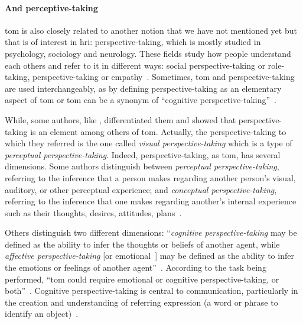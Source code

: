 \documentclass[a4paper,11pt,twoside]{StyleThese}
\begin{document}
\paragraph{And perceptive-taking} \acrshort{tom} is also closely related to another notion that we have not mentioned yet but that is of interest in \acrshort{hri}: perspective-taking, which is mostly studied in psychology, sociology and neurology. These fields study how people understand each others and refer to it in different ways: social perspective-taking or role-taking, perspective-taking or empathy~\citep{davis_2017_self,quesque_2020_theory}. Sometimes, \acrshort{tom} and perspective-taking are used interchangeably, as by \cite{charlop_2003_using} defining perspective-taking as an elementary aspect of \acrshort{tom} or \acrshort{tom} can be a synonym of ``cognitive perspective-taking''~\citep{barnes_2004_perspective}. 

While, some authors, like \cite{westby_2014_developmental}, differentiated them and showed that perspective-taking is an element among others of \acrshort{tom}. Actually, the perspective-taking to which they referred is the one called \emph{visual perspective-taking} which is a type of \emph{perceptual perspective-taking}. Indeed, perspective-taking, as \acrshort{tom}, has several dimensions. Some authors distinguish between \emph{perceptual perspective-taking}, referring to the inference that a person makes regarding another person's visual, auditory, or other perceptual experience; and \emph{conceptual perspective-taking}, referring to the inference that one makes regarding another's internal experience such as their thoughts, desires, attitudes, plans~\citep{marvin_1976_early}. 

Others distinguish two different dimensions: ``\emph{cognitive perspective-taking} may be defined as the ability to infer the thoughts or beliefs of another agent, while \emph{affective perspective-taking} [or emotional~\citep{hynes_2006_differential}] may be defined as the ability to infer the emotions or feelings of another agent''~\citep[p.~2]{healey_2018_cognitive}. According to the task being performed, ``\acrlong{tom} could require emotional or cognitive perspective-taking, or both''~\citep[p.~375]{hynes_2006_differential}. Cognitive perspective-taking is central to communication, particularly in the creation and understanding of referring expression (\ie a word or phrase to identify an object)~\citep{krauss_1991_perspective}.

\bigskip
\end{document}
